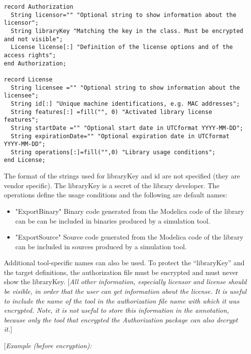 \begin{lstlisting}[language=modelica]
record Authorization
  String licensor="" "Optional string to show information about the licensor";
  String libraryKey "Matching the key in the class. Must be encrypted and not visible";
  License license[:] "Definition of the license options and of the access rights";
end Authorization;

record License
  String licensee ="" "Optional string to show information about the licensee";
  String id[:] "Unique machine identifications, e.g. MAC addresses";
  String features[:] =fill("", 0) "Activated library license features";
  String startDate ="" "Optional start date in UTCformat YYYY-MM-DD";
  String expirationDate="" "Optional expiration date in UTCformat YYYY-MM-DD";
  String operations[:]=fill("",0) "Library usage conditions";
end License;
\end{lstlisting}
The format of the strings used for libraryKey and id are not specified
(they are vendor specific). The libraryKey is a secret of the library
developer. The operations define the usage conditions and the following
are default names:

\begin{itemize}
\item
  "ExportBinary" Binary code generated from the Modelica code of the
  library can be can be included in binaries produced by a simulation
  tool.
\item
  "ExportSource" Source code generated from the Modelica code of the
  library can be included in sources produced by a simulation tool.
\end{itemize}

Additional tool-specific names can also be used. To protect the
``libraryKey'' and the target definitions, the authorization file must
be encrypted and must never show the libraryKey. {[}\emph{All other
information, especially licensor and license should be visible, in order
that the user can get information about the license. It is useful to
include the name of the tool in the authorization file name with which
it was encrypted. Note, it is not useful to store this information in
the annotation, because only the tool that encrypted the Authorization
package can also decrypt it.}{]}

{[}\emph{Example (before encryption):}

